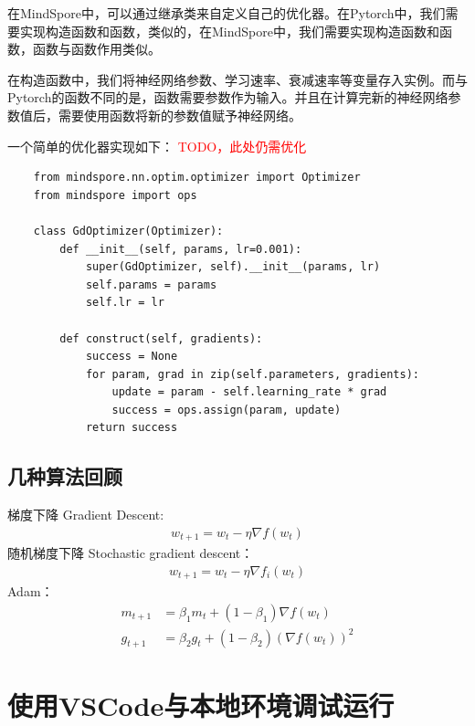 在MindSpore中，可以通过继承类来自定义自己的优化器。在Pytorch中，我们需要实现构造函数和函数，类似的，在MindSpore中，我们需要实现构造函数和函数，函数与函数作用类似。

在构造函数中，我们将神经网络参数、学习速率、衰减速率等变量存入实例。而与Pytorch的函数不同的是，函数需要参数作为输入。并且在计算完新的神经网络参数值后，需要使用函数将新的参数值赋予神经网络。

一个简单的优化器实现如下：
\textcolor{red}{TODO，此处仍需优化}
\begin{lstlisting}
    from mindspore.nn.optim.optimizer import Optimizer
    from mindspore import ops

    class GdOptimizer(Optimizer):
        def __init__(self, params, lr=0.001):
            super(GdOptimizer, self).__init__(params, lr)
            self.params = params
            self.lr = lr
        
        def construct(self, gradients):
            success = None
            for param, grad in zip(self.parameters, gradients):
                update = param - self.learning_rate * grad
                success = ops.assign(param, update)
            return success
\end{lstlisting}

\subsection{几种算法回顾}

梯度下降 Gradient Descent:
\begin{align} 
w_{t+1} = w_t - \eta \nabla f(w_t)
\end{align}
随机梯度下降 Stochastic gradient descent：
\begin{align} 
w_{t+1} = w_t - \eta \nabla f_i(w_t)
\end{align}
Adam：
\begin{align} %
    m_{t+1} & = \beta_1 m_t + (1-\beta_1) \nabla f(w_t)   \\
    g_{t+1} & = \beta_2 g_t + (1-\beta_2) (\nabla f(w_t))^2
\end{align}


\section{使用VSCode与本地环境调试运行}\label{sec:task1-local-debug}

